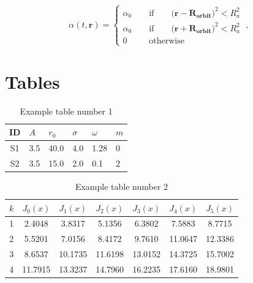 \vspace{0.4cm}

\begin{equation}
	\alpha(t , \mathbf{r}) = 
	\begin{cases}
		\alpha_0 \qquad \text{if} \qquad (\mathbf{r} -\mathbf{R_{orbit})}^2 < R_a^2 \\
		\alpha_0 \qquad \text{if} \qquad (\mathbf{r} +\mathbf{ R_{orbit})}^2 < R_a^2 \\
		0   \; \;\qquad \text{otherwise}
		\label{eq:alpha_binary_bh}
	\end{cases} \; ,
\end{equation}

\vspace{0.4cm}

\section{Tables}

\begin{table}[h]
	\caption{Example table number 1}
	\label{table:an_example_table}
	\centering
	\begin{tabular}{clllll}
		\toprule
		\midrule[0.4pt]
		ID&$A$  & $r_0$  &  $\sigma$ &  $\omega$  &  $m$  \\
		\midrule
		S1 & 3.5 & 40.0 & 4.0 & 1.28 & 0 \\
		S2 & 3.5 & 15.0 & 2.0 & 0.1 & 2 \\
		\bottomrule
	\end{tabular}
\end{table}


\begin{table}[h!]
	\centering
	\caption{Example table number 2}
	\begin{tabular}{SSSSSSS}
		\toprule
		 & {$J_0(x)$} & {$J_1(x)$} & {$J_2(x)$} & {$J_3(x)$} & {$J_4(x)$} & {$J_5(x)$} \\ 
		     & 2.4048     & 3.8317     & 5.1356     & 6.3802     & 7.5883     & 8.7715     \\
		2     & 5.5201     & 7.0156     & 8.4172     & 9.7610     & 11.0647    & 12.3386    \\
		3     & 8.6537     & 10.1735    & 11.6198    & 13.0152    & 14.3725    & 15.7002    \\
		4     & 11.7915    & 13.3237    & 14.7960    & 16.2235    & 17.6160    & 18.9801     \\ 
		\midrule[0.4pt]
		\bottomrule
	\end{tabular}
	\label{table:bessel_zeros}
\end{table}


